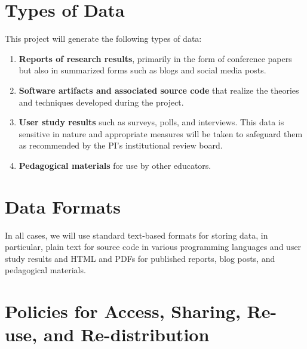 \documentclass[11pt]{article}
\begin{document}
\smalltitle{}

\section*{Types of Data}

This project will generate the following types of data:
\begin{enumerate}
  \item \textbf{Reports of research results}, primarily in the form of conference papers but also in summarized forms such as blogs and social media posts.
  \item \textbf{Software artifacts and associated source code} that realize the theories and techniques developed during the project.
  \item \textbf{User study results} such as surveys, polls, and interviews.
    This data is sensitive in nature and appropriate measures will be taken to safeguard them as recommended by the PI's institutional review board.
  \item \textbf{Pedagogical materials} for use by other educators.
\end{enumerate}

\section*{Data Formats}

In all cases, we will use standard text-based formats for storing data, in particular, plain text for source code in various programming languages and user study results and HTML and PDFs for published reports, blog posts, and pedagogical materials.

\section*{Policies for Access, Sharing, Re-use, and Re-distribution}
\end{document}

